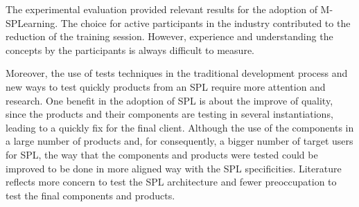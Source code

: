 \begin{itemize}
The experimental evaluation provided relevant results for the adoption of M-SPLear\allowbreak ning. The choice for active participants in the industry contributed to the reduction of the training session. However, experience and understanding the concepts by the participants is always difficult to measure.
\end{itemize}

Moreover, the use of tests techniques in the traditional development process and new ways to test quickly products from an SPL require more attention and research. One benefit in the adoption of SPL is about the improve of quality, since the products and their components are testing in several instantiations, leading to a quickly fix for the final client. Although the use of the components in a large number of products and, for consequently, a bigger number of target users for SPL, the way that the components and products were tested could be improved to be done in more aligned way with the SPL specificities. Literature reflects more concern to test the SPL architecture and fewer preoccupation to test the final components and products.